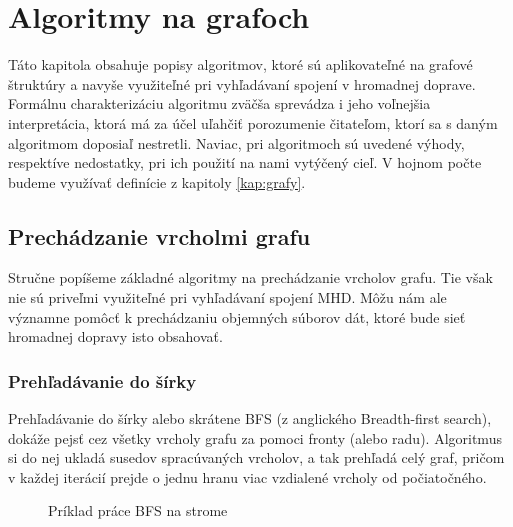 \chapter{Algoritmy na grafoch}
\label{kap:algoritmy}

Táto kapitola obsahuje popisy algoritmov, ktoré sú aplikovateľné na grafové štruktúry a navyše využiteľné pri vyhľadávaní spojení v hromadnej doprave. Formálnu charakterizáciu algoritmu zväčša sprevádza i jeho voľnejšia interpretácia, ktorá má za účel uľahčiť porozumenie čitateľom, ktorí sa s daným algoritmom doposiaľ nestretli. Naviac, pri algoritmoch sú uvedené výhody, respektíve nedostatky, pri ich použití na nami vytýčený cieľ. V hojnom počte budeme využívať definície z kapitoly \ref{kap:grafy}.\newline


\section{Prechádzanie vrcholmi grafu}

Stručne popíšeme základné algoritmy na prechádzanie vrcholov grafu. Tie však nie sú priveľmi využiteľné pri vyhľadávaní spojení MHD. Môžu nám ale významne pomôcť k prechádzaniu objemných súborov dát, ktoré bude sieť hromadnej dopravy isto obsahovať.\newline


\subsection{Prehľadávanie do šírky}

Prehľadávanie do šírky alebo skrátene BFS (z anglického Breadth-first search), dokáže pejsť cez všetky vrcholy grafu za pomoci fronty (alebo radu). Algoritmus si do nej ukladá susedov spracúvaných vrcholov, a tak prehľadá celý graf, pričom v každej iterácií prejde o jednu hranu viac vzdialené vrcholy od počiatočného.\newline

\begin{figure}[H]
  \caption{Príklad práce BFS na strome}
  \label{BFS_priklad}
\end{figure}


